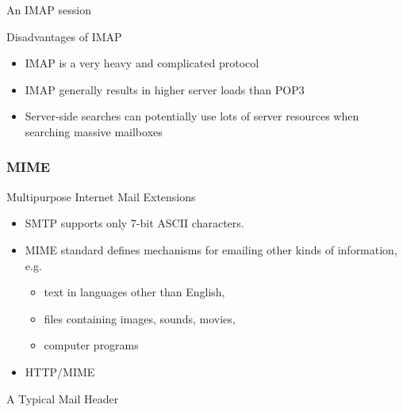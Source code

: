 \begin{frame}
  \begin{iblock}{An IMAP session}
    \begin{center}
    \end{center}
  \end{iblock}
\end{frame}
  
\begin{frame}
  \begin{iblock}{Disadvantages of IMAP}
    \begin{itemize}
    \item IMAP is a very heavy and complicated protocol
    \item IMAP generally results in higher server loads than POP3
    \item Server-side searches can potentially use lots of server resources when searching
      massive mailboxes
    \end{itemize}
  \end{iblock}
\end{frame}

\subsubsection{MIME}

\begin{frame}{Multipurpose Internet Mail Extensions}
  \begin{itemize}
  \item SMTP supports only 7-bit ASCII characters.
  \item MIME standard defines mechanisms for emailing other kinds of information, e.g.
    \begin{itemize}
    \item text in languages other than English,
    \item files containing images, sounds, movies,
    \item computer programs
    \end{itemize}
  \item HTTP/MIME
  \end{itemize}
\end{frame}

\begin{frame}
  \begin{iblock}{A Typical Mail Header}
    \begin{center}
    \end{center} \label{fig:mail_header}
  \end{iblock}
\end{frame}

